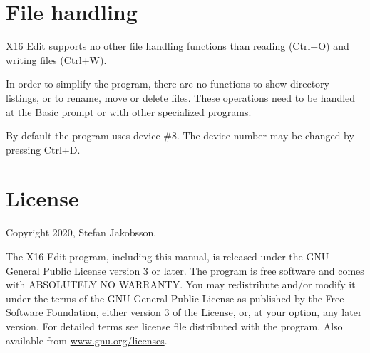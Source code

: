 \documentclass{article}
\begin{document}
\section{File handling}

    X16 Edit supports no other file handling functions than reading (Ctrl+O) and writing files (Ctrl+W).

    In order to simplify the program, there are no functions to show directory listings,
    or to rename, move or delete files. These operations need to be handled at the
    Basic prompt or with other specialized programs.

    By default the program uses device \#8. The device
    number may be changed by pressing Ctrl+D.


\section{License}

	Copyright 2020, Stefan Jakobsson.

	The X16 Edit program, including this manual, is released under the GNU General Public License version 3 or later.
    The program is free software and comes with ABSOLUTELY NO WARRANTY. You may redistribute and/or modify it under the 
    terms of the GNU General Public License as pub­lished by the Free Software Foundation, either version 3 of the License, 
    or, at your option, any later version. For detailed terms see license file distributed with the program. 
    Also available from \href{https://www.gnu.org/licenses}{www.gnu.org/licenses}.
\end{document}
